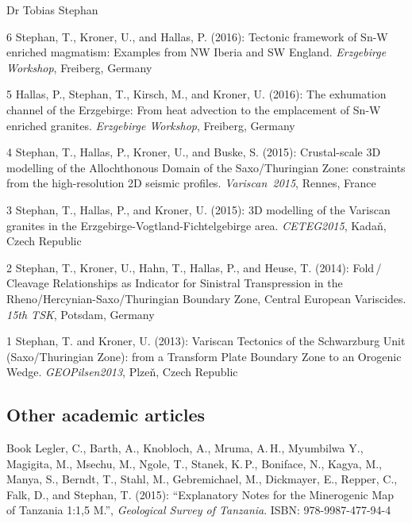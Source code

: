 \documentclass[10pt, paper=letter]{scrartcl} %
\begin{document}
\begin{cv}{\textsf{Dr Tobias Stephan}}
\begin{cvlist}{}
        \item[6] Stephan, T., Kroner, U., and Hallas, P. (2016): Tectonic framework of \mbox{Sn-W} enriched magmatism: Examples from NW Iberia and SW England. \textit{Erzgebirge Workshop}, Freiberg, Germany
        \item[5] Hallas, P., Stephan, T., Kirsch, M., and Kroner, U.  (2016): The exhumation channel of the Erzgebirge: From heat advection to the emplacement of Sn-W enriched granites. \textit{Erzgebirge Workshop}, Freiberg, Germany
        \item[4] Stephan, T., Hallas, P., Kroner, U., and Buske, S. (2015): Crustal-scale 3D modelling of the Allochthonous Domain of the Saxo\-/Thuringian Zone: constraints from the high-resolution 2D seismic profiles. \mbox{\textit{Variscan 2015}}, Rennes, France
        \item[3] Stephan, T., Hallas, P., and Kroner, U. (2015): 3D modelling of the Variscan granites in the Erzgebirge-Vogtland-Fichtelgebirge area. \mbox{\textit{CETEG2015}}, Kada\v{n}, Czech Republic
        \item[2] Stephan, T., Kroner, U., Hahn, T., Hallas, P., and Heuse, T. (2014): Fold\,/ Cleavage Relationships as Indicator for Sinistral Transpression in the Rheno\-/Hercynian\--Saxo\-/Thuringian Boundary Zone, Central European Variscides. \textit{15th TSK}, Potsdam, Germany
        \item[1] Stephan, T. and Kroner, U. (2013): Variscan Tectonics of the Schwarzburg Unit (Saxo\-/Thuringian Zone): from a Transform Plate Boundary Zone to an Orogenic Wedge. \textit{GEOPilsen2013}, Plze\v{n}, Czech Republic
    \end{cvlist}

    \subsection{Other academic articles}
    \begin{cvlist}{}
        \item[Book] Legler, C., Barth, A., Knobloch, A., Mruma, A.\,H., Myumbilwa Y.,
        Magigita, M., Msechu, M., Ngole, T., Stanek, K.\,P., Boniface, N., Kagya, M.,
        Manya, S., Berndt, T., Stahl, M., Gebremichael, M., Dickmayer, E., Repper, C.,
        Falk, D., and Stephan, T. (2015): \enquote{Explanatory Notes for the
            Minerogenic Map of Tanzania 1:1,5 M.}, \textit{Geological Survey of Tanzania}.
        ISBN: 978-9987-477-94-4
    \end{cvlist}


\end{cv}
\end{document}
